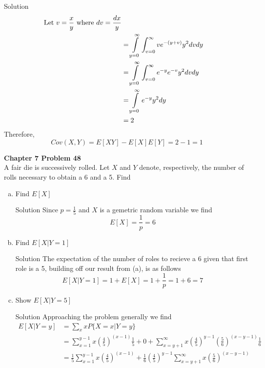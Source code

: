 \documentclass{article}
\begin{document}
\begin{spacing}{1.1}
\begin{homeworkProblem}
\begin{homeworkSection}{Solution}
\begin{align*}
      \text{Let $ v = \frac{ x}{ y}$ where $dv = \frac{ dx}{ y}$}\\
      &= \int\limits_{y = 0}^\infty \int_{v = 0}^\infty v e^{-(y + v)} y^2 dv dy\\
      &= \int\limits_{y = 0}^\infty \int_{v = 0}^\infty e^{-y} e^{-v} y^2 dv dy\\
      &= \int\limits_{y = 0}^\infty  e^{-y} y^2 dy\\
      &= 2
    \end{align*}
    Therefore, \[Cov(X, Y) = E[XY] - E[X]E[Y] = 2 - 1 = 1\]
  \end{homeworkSection}
\end{homeworkProblem}

\newpage
\begin{homeworkProblem}
  {\bf Chapter 7 Problem 48}\\
  A fair die is successively rolled. Let $X$ and $Y$ denote, 
  respectively, the number of rolls necessary to obtain a 
  6 and a 5. Find
  \begin{enumerate}[(a)]
    \item Find $E[X]$
      \begin{homeworkSection}{Solution}
        Since $p = \frac{ 1}{ 5}$ and $X$ is a gemetric random variable we find
        \[E[ X] = \frac{ 1}{ p} = 6\]
      \end{homeworkSection}
    \item Find $E[X|Y = 1]$
      \begin{homeworkSection}{Solution}
        The expectation of the number of roles to recieve a 6 given that first
        role is a 5, building off our result from (a), is as follows
        \[E[ X|Y = 1] = 1 + E[ X] = 1 + \frac{ 1}{ p} = 1 + 6 = 7\]
      \end{homeworkSection}
    \item Show $E[X|Y = 5]$
      \begin{homeworkSection}{Solution}
        Approaching the problem generally we find
        \begin{align*}
          E[ X|Y = y] 
          &= \sum\limits_{x} x P\{ X = x | Y = y\} \\
          &= \sum\limits_{x = 1}^{y - 1} x (\frac{ 4}{ 5})^{(x - 1)}\frac{ 1}{ 5} + 0 + 
            \sum\limits_{x = y + 1}^\infty x (\frac{ 4}{ 5})^{y - 1} 
            (\frac{ 5}{ 6})^{(x - y - 1)} \frac{ 1}{ 6}\\
          &=\frac{1}{5}\sum\limits_{x=1}^{y-1}x(\frac{4}{5})^{(x-1)}+\frac{1}{6}(\frac{4}{5})^{y-1}\sum\limits_{x=y+1}^\infty x(\frac{5}{6})^{(x-y-1)}\\

\end{align*}
\end{homeworkSection}
\end{enumerate}
\end{homeworkProblem}
\end{spacing}
\end{document}
